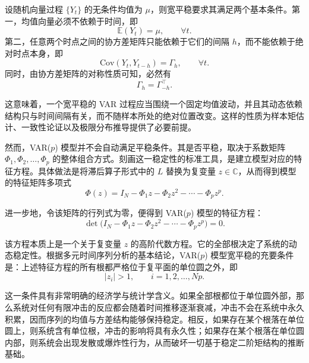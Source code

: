 设随机向量过程 $\{Y_t\}$ 的无条件均值为 $\mu$，则宽平稳要求其满足两个基本条件。第一，均值向量必须不依赖于时间，即
\begin{equation}
\mathbb{E}(Y_t)=\mu, \qquad \forall t.
\end{equation}
第二，任意两个时点之间的协方差矩阵只能依赖于它们的间隔 $h$，而不能依赖于绝对时点本身，即
\begin{equation}
\mathrm{Cov}(Y_t,Y_{t-h})=\Gamma_h, \qquad \forall t.
\end{equation}
同时，由协方差矩阵的对称性质可知，必然有
\begin{equation}
\Gamma_h=\Gamma_{-h}^\top.
\end{equation}

这意味着，一个宽平稳的 VAR 过程应当围绕一个固定均值波动，并且其动态依赖结构只与时间间隔有关，而不随样本所处的绝对位置改变。这样的性质为样本矩估计、一致性论证以及极限分布推导提供了必要前提。

然而，VAR($p$) 模型并不会自动满足平稳条件。其是否平稳，取决于系数矩阵 $\Phi_1,\Phi_2,\dots,\Phi_p$ 的整体组合方式。刻画这一稳定性的标准工具，是建立模型对应的特征方程。具体做法是将滞后算子形式中的 $L$ 替换为复变量 $z\in\mathbb{C}$，从而得到模型的特征矩阵多项式
\begin{equation}
\Phi(z)=I_N-\Phi_1 z-\Phi_2 z^2-\cdots-\Phi_p z^p.
\end{equation}

进一步地，令该矩阵的行列式为零，便得到 VAR($p$) 模型的特征方程：
\begin{equation}
\det\bigl(I_N-\Phi_1 z-\Phi_2 z^2-\cdots-\Phi_p z^p\bigr)=0.
\end{equation}

该方程本质上是一个关于复变量 $z$ 的高阶代数方程。它的全部根决定了系统的动态稳定性。根据多元时间序列分析的基本结论，VAR($p$) 模型宽平稳的充要条件是：上述特征方程的所有根都严格位于复平面的单位圆之外，即
\begin{equation}
|z_i|>1, \qquad i=1,2,\dots,Np.
\end{equation}

这一条件具有非常明确的经济学与统计学含义。如果全部根都位于单位圆外部，那么系统对任何有限冲击的反应都会随着时间推移逐渐衰减，冲击不会在系统中永久积累，因而序列的均值与方差结构能够保持稳定。相反，如果存在某个根落在单位圆上，则系统含有单位根，冲击的影响将具有永久性；如果存在某个根落在单位圆内部，则系统会出现发散或爆炸性行为，从而破坏一切基于稳定二阶矩结构的推断基础。

